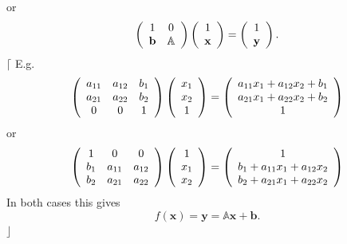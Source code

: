 \documentclass[aps,preprint]{revtex4}%
\begin{document}
or%
\begin{equation}
\left(
\begin{array}
[c]{cc}%
1 & 0\\
\mathbf{b} & \mathbb{A}%
\end{array}
\right)  \left(
\begin{array}
[c]{c}%
1\\
\mathbf{x}%
\end{array}
\right)  =\left(
\begin{array}
[c]{c}%
1\\
\mathbf{y}%
\end{array}
\right)  .
\end{equation}
$\lceil$ E.g.
\begin{equation}
\left(
\begin{array}
[c]{ccc}%
a_{11} & a_{12} & b_{1}\\
a_{21} & a_{22} & b_{2}\\
0 & 0 & 1
\end{array}
\right)  \left(
\begin{array}
[c]{c}%
x_{1}\\
x_{2}\\
1
\end{array}
\right)  =\left(
\begin{array}
[c]{c}%
a_{11}x_{1}+a_{12}x_{2}+b_{1}\\
a_{21}x_{1}+a_{22}x_{2}+b_{2}\\
1
\end{array}
\right)
\end{equation}
or%
\begin{equation}
\left(
\begin{array}
[c]{ccc}%
1 & 0 & 0\\
b_{1} & a_{11} & a_{12}\\
b_{2} & a_{21} & a_{22}%
\end{array}
\right)  \left(
\begin{array}
[c]{c}%
1\\
x_{1}\\
x_{2}%
\end{array}
\right)  =\left(
\begin{array}
[c]{c}%
1\\
b_{1}+a_{11}x_{1}+a_{12}x_{2}\\
b_{2}+a_{21}x_{1}+a_{22}x_{2}%
\end{array}
\right)
\end{equation}
In both cases this gives
\begin{equation}
f\left(  \mathbf{x}\right)  =\mathbf{y}=\mathbb{A}\mathbf{x+b.}%
\end{equation}
$\rfloor$
\end{document}
